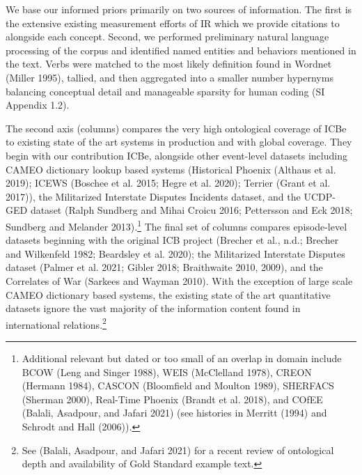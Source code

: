 \documentclass{article}
\renewcommand{\arraystretch}{0.8}
\begin{document}
We base our informed priors primarily on two sources of information. The
first is the extensive existing measurement efforts of IR which we
provide citations to alongside each concept. Second, we performed
preliminary natural language processing of the corpus and identified
named entities and behaviors mentioned in the text. Verbs were matched
to the most likely definition found in Wordnet (Miller 1995), tallied,
and then aggregated into a smaller number hypernyms balancing conceptual
detail and manageable sparsity for human coding (SI Appendix 1.2).

The second axis (columns) compares the very high ontological coverage of
ICBe to existing state of the art systems in production and with global
coverage. They begin with our contribution ICBe, alongside other
event-level datasets including CAMEO dictionary lookup based systems
(Historical Phoenix (Althaus et al. 2019); ICEWS (Boschee et al. 2015;
Hegre et al. 2020); Terrier (Grant et al. 2017)), the Militarized
Interstate Disputes Incidents dataset, and the UCDP-GED dataset (Ralph
Sundberg and Mihai Croicu 2016; Pettersson and Eck 2018; Sundberg and
Melander 2013).\footnote{Additional relevant but dated or too small of
  an overlap in domain include BCOW (Leng and Singer 1988), WEIS
  (McClelland 1978), CREON (Hermann 1984), CASCON (Bloomfield and
  Moulton 1989), SHERFACS (Sherman 2000), Real-Time Phoenix (Brandt et
  al. 2018), and COfEE (Balali, Asadpour, and Jafari 2021) (see
  histories in Merritt (1994) and Schrodt and Hall (2006)).} The final
set of columns compares episode-level datasets beginning with the
original ICB project (Brecher et al., n.d.; Brecher and Wilkenfeld 1982;
Beardsley et al. 2020); the Militarized Interstate Disputes dataset
(Palmer et al. 2021; Gibler 2018; Braithwaite 2010, 2009), and the
Correlates of War (Sarkees and Wayman 2010). With the exception of large
scale CAMEO dictionary based systems, the existing state of the art
quantitative datasets ignore the vast majority of the information
content found in international relations.\footnote{See (Balali,
  Asadpour, and Jafari 2021) for a recent review of ontological depth
  and availability of Gold Standard example text.}

\clearpage

\providecommand{\docline}[3]{\noalign{\global\setlength{\arrayrulewidth}{#1}}\arrayrulecolor[HTML]{#2}\cline{#3}}

\setlength{\tabcolsep}{2pt}

\renewcommand*{\arraystretch}{0.75}
\end{document}
